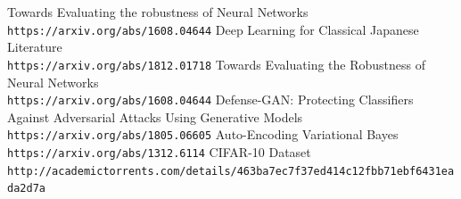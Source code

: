 \documentclass[11pt]{article}
\begin{document}
\begin{thebibliography}{9}

Towards Evaluating the robustness of Neural Networks
\\\texttt{https://arxiv.org/abs/1608.04644}
Deep Learning for Classical Japanese Literature \\
\texttt{https://arxiv.org/abs/1812.01718}
Towards Evaluating the Robustness of Neural Networks
\\\texttt{https://arxiv.org/abs/1608.04644}
Defense-GAN: Protecting Classifiers Against Adversarial Attacks Using Generative Models\\
\texttt{https://arxiv.org/abs/1805.06605}
Auto-Encoding Variational Bayes\\
\texttt{https://arxiv.org/abs/1312.6114}
CIFAR-10 Dataset\\
\texttt{http://academictorrents.com/details/463ba7ec7f37ed414c12fbb71ebf6431eada2d7a}

\end{thebibliography}
\end{document}

